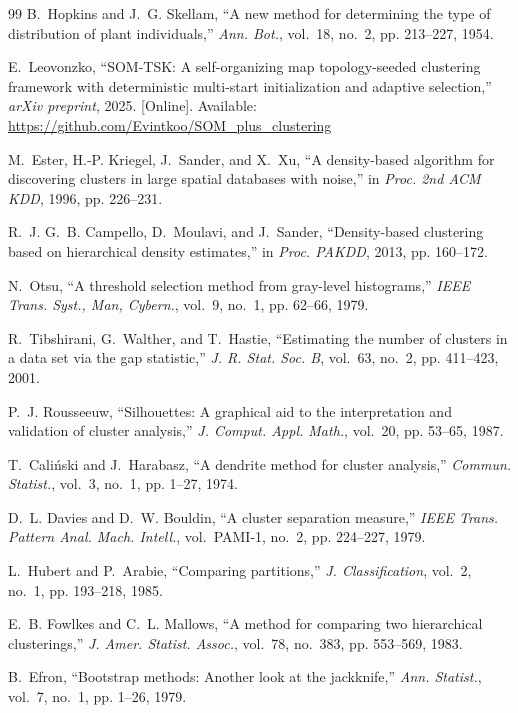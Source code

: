 \documentclass[journal]{IEEEtran}
\begin{document}
\begin{thebibliography}{99}
B.~Hopkins and J.~G. Skellam, ``A new method for determining the type of distribution of plant individuals,'' \emph{Ann. Bot.}, vol.~18, no.~2, pp. 213--227, 1954.

E.~Leovonzko, ``SOM-TSK: A self-organizing map topology-seeded clustering framework with deterministic multi-start initialization and adaptive selection,'' \emph{arXiv preprint}, 2025. [Online]. Available: \url{https://github.com/Evintkoo/SOM_plus_clustering}

M.~Ester, H.-P. Kriegel, J.~Sander, and X.~Xu, ``A density-based algorithm for discovering clusters in large spatial databases with noise,'' in \emph{Proc. 2nd ACM KDD}, 1996, pp. 226--231.

R.~J. G.~B. Campello, D.~Moulavi, and J.~Sander, ``Density-based clustering based on hierarchical density estimates,'' in \emph{Proc. PAKDD}, 2013, pp. 160--172.

N.~Otsu, ``A threshold selection method from gray-level histograms,'' \emph{IEEE Trans. Syst., Man, Cybern.}, vol.~9, no.~1, pp. 62--66, 1979.

R.~Tibshirani, G.~Walther, and T.~Hastie, ``Estimating the number of clusters in a data set via the gap statistic,'' \emph{J. R. Stat. Soc. B}, vol.~63, no.~2, pp. 411--423, 2001.

P.~J. Rousseeuw, ``Silhouettes: A graphical aid to the interpretation and validation of cluster analysis,'' \emph{J. Comput. Appl. Math.}, vol.~20, pp. 53--65, 1987.

T.~Cali\'{n}ski and J.~Harabasz, ``A dendrite method for cluster analysis,'' \emph{Commun. Statist.}, vol.~3, no.~1, pp. 1--27, 1974.

D.~L. Davies and D.~W. Bouldin, ``A cluster separation measure,'' \emph{IEEE Trans. Pattern Anal. Mach. Intell.}, vol.~PAMI-1, no.~2, pp. 224--227, 1979.

L.~Hubert and P.~Arabie, ``Comparing partitions,'' \emph{J. Classification}, vol.~2, no.~1, pp. 193--218, 1985.

E.~B. Fowlkes and C.~L. Mallows, ``A method for comparing two hierarchical clusterings,'' \emph{J. Amer. Statist. Assoc.}, vol.~78, no.~383, pp. 553--569, 1983.

B.~Efron, ``Bootstrap methods: Another look at the jackknife,'' \emph{Ann. Statist.}, vol.~7, no.~1, pp. 1--26, 1979.


\end{thebibliography}
\end{document}
